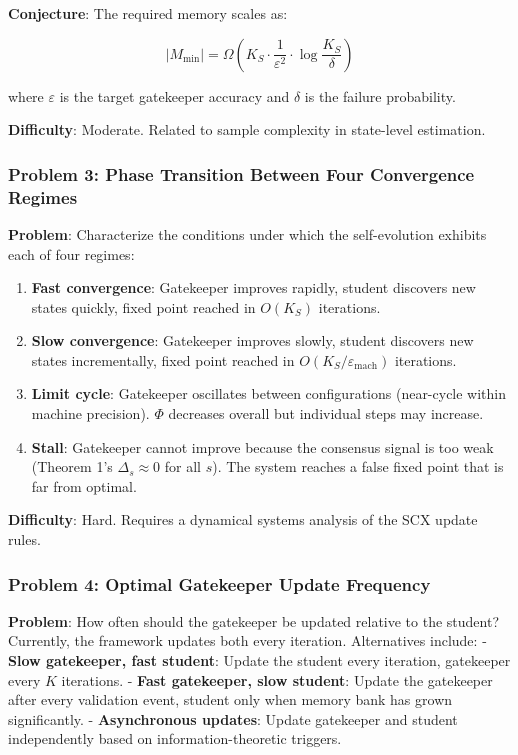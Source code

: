 \documentclass[
  12pt,
]{article}
\providecommand{\tightlist}{%
  \setlength{\itemsep}{0pt}\setlength{\parskip}{0pt}}
\begin{document}
\textbf{Conjecture}: The required memory scales as:

\[|M_{\min}| = \Omega\left(K_S \cdot \frac{1}{\varepsilon^2} \cdot \log\frac{K_S}{\delta}\right)\]

where \(\varepsilon\) is the target gatekeeper accuracy and \(\delta\)
is the failure probability.

\textbf{Difficulty}: Moderate. Related to sample complexity in
state-level estimation.

\subsubsection{Problem 3: Phase Transition Between Four Convergence
Regimes}\label{problem-3-phase-transition-between-four-convergence-regimes}

\textbf{Problem}: Characterize the conditions under which the
self-evolution exhibits each of four regimes:

\begin{enumerate}
\def\labelenumi{\arabic{enumi}.}
\tightlist
\item
  \textbf{Fast convergence}: Gatekeeper improves rapidly, student
  discovers new states quickly, fixed point reached in \(O(K_S)\)
  iterations.
\item
  \textbf{Slow convergence}: Gatekeeper improves slowly, student
  discovers new states incrementally, fixed point reached in
  \(O(K_S/\varepsilon_{\text{mach}})\) iterations.
\item
  \textbf{Limit cycle}: Gatekeeper oscillates between configurations
  (near-cycle within machine precision). \(\Phi\) decreases overall but
  individual steps may increase.
\item
  \textbf{Stall}: Gatekeeper cannot improve because the consensus signal
  is too weak (Theorem 1's \(\Delta_s \approx 0\) for all \(s\)). The
  system reaches a false fixed point that is far from optimal.
\end{enumerate}

\textbf{Difficulty}: Hard. Requires a dynamical systems analysis of the
SCX update rules.

\subsubsection{Problem 4: Optimal Gatekeeper Update
Frequency}\label{problem-4-optimal-gatekeeper-update-frequency}

\textbf{Problem}: How often should the gatekeeper be updated relative to
the student? Currently, the framework updates both every iteration.
Alternatives include: - \textbf{Slow gatekeeper, fast student}: Update
the student every iteration, gatekeeper every \(K\) iterations. -
\textbf{Fast gatekeeper, slow student}: Update the gatekeeper after
every validation event, student only when memory bank has grown
significantly. - \textbf{Asynchronous updates}: Update gatekeeper and
student independently based on information-theoretic triggers.
\end{document}
